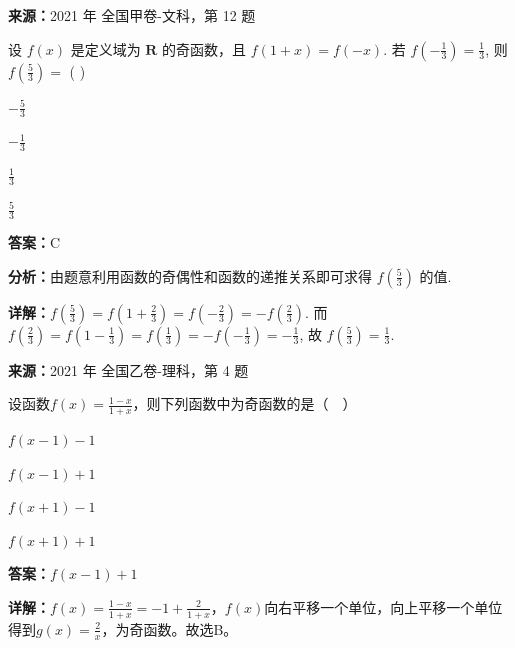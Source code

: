 \begin{question}[points=5]
\textbf{来源：}2021 年 全国甲卷-文科，第 12 题\par
设 $f(x)$ 是定义域为 $\mathbf{R}$ 的奇函数，且 $f(1+x)=f(-x)$. 若 $f\left(-\frac{1}{3}\right) = \frac{1}{3}$, 则 $f\left(\frac{5}{3}\right) =$ ( )
\begin{choices}
  \item $-\frac{5}{3}$
  \item $-\frac{1}{3}$
  \item $\frac{1}{3}$
  \item $\frac{5}{3}$
\end{choices}
\begin{solution}
\textbf{答案：}C

\textbf{分析：}由题意利用函数的奇偶性和函数的递推关系即可求得 $f\left(\frac{5}{3}\right)$ 的值.

\textbf{详解：}$f\left(\frac{5}{3}\right) = f\left(1+\frac{2}{3}\right) = f\left(-\frac{2}{3}\right) = -f\left(\frac{2}{3}\right)$. 而 $f\left(\frac{2}{3}\right) = f\left(1-\frac{1}{3}\right) = f\left(\frac{1}{3}\right) = -f\left(-\frac{1}{3}\right) = -\frac{1}{3}$, 故 $f\left(\frac{5}{3}\right) = \frac{1}{3}$.
\end{solution}
\end{question}

\begin{question}[points=5]
\textbf{来源：}2021 年 全国乙卷-理科，第 4 题\par
设函数$f(x)=\frac{1-x}{1+x}$，则下列函数中为奇函数的是（  ）
\begin{choices}
  \item $f(x-1)-1$
  \item $f(x-1)+1$
  \item $f(x+1)-1$
  \item $f(x+1)+1$
\end{choices}
\begin{solution}
\textbf{答案：}$f(x-1)+1$

\textbf{详解：}$f(x)=\frac{1-x}{1+x}=-1+\frac{2}{1+x}$，$f(x)$向右平移一个单位，向上平移一个单位得到$g(x)=\frac{2}{x}$，为奇函数。故选B。
\end{solution}
\end{question}

